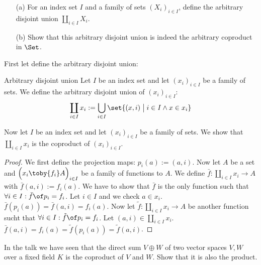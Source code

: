 \begin{exercise}
  \begin{itemize}
    \item[(a)]For an index set $I$ and a family of sets $(X_i)_{i \in I}$, define the arbitrary disjoint union $\coprod_{i \in I}{X_i}$.
    \item[(b)]Show that this arbitrary disjoint union is indeed the arbitrary coproduct in $\Set$.
  \end{itemize}
\end{exercise}

\begin{answer}
  First let define the arbitrary disjoint union:
  \begin{definition}{Arbitrary disjoint union}
    Let $I$ be an index set and let $(x_i)_{i \in I}$ be a family of sets.
    We define the arbitrary disjoint union of $(x_i)_{i\in I}$:
    $$\coprod_{i \in I} {x_i} := \bigcup_{i \in I} \set{ (x, i) \;\big|\; i \in I \land x \in x_i}$$
  \end{definition}
  Now let $I$ be an index set and let $(x_i)_{i\in I}$ be a family of sets. We show that $\coprod_{i \in I} {x_i}$ is the coproduct of $(x_i)_{i\in I}$.
  \begin{proof}
    We first define the projection maps: $p_i(a) := (a, i)$.
    Now let $A$ be a set and $\Bigl(x_i \toby{f_i} A\Bigr)_{i \in I}$ be a family of functions to $A$.
    We define $\bar{f} : \coprod_{i \in I} {x_i} \to A$ with $\bar{f}(a, i) := f_i(a)$.
    We have to show that $\bar{f}$ is the only function such that
    $\forall i \in I: \bar{f} \of p_i = f_i$.
    Let $i \in I$ and we check $a \in x_i$. $\bar{f}(p_i(a)) = \bar{f}(a,i) = f_i(a)$.
    Now let $\tilde{f} : \coprod_{i \in I} {x_i} \to A$ be another function sucht that
    $\forall i \in I: \tilde{f} \of p_i = f_i$.
    Let $(a, i) \in \coprod_{i \in I} {x_i}$. $\bar{f}(a,i)= f_i(a) = \tilde{f}(p_i(a)) = \tilde{f}(a,i)$.\qedhere
  \end{proof}
\end{answer}

\begin{exercise}
  In the talk we have seen that the direct sum $V \oplus W$ of two vector spaces $V, W$ over a fixed field $K$ is the coproduct of $V$ and $W$.
  Show that it is also the product.
\end{exercise}

